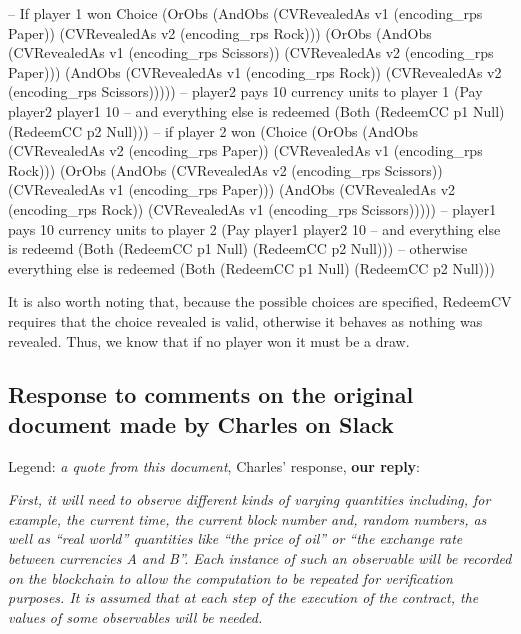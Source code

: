 \documentclass[
      acmsmall
    , screen
    , review=true
  ]{acmart}
\begin{document}
-- If player 1 won
Choice (OrObs (AndObs (CVRevealedAs v1 (encoding\_rps Paper))
                      (CVRevealedAs v2 (encoding\_rps Rock)))
              (OrObs (AndObs (CVRevealedAs v1 (encoding\_rps Scissors))
                             (CVRevealedAs v2 (encoding\_rps Paper)))
                     (AndObs (CVRevealedAs v1 (encoding\_rps Rock))
                             (CVRevealedAs v2 (encoding\_rps Scissors)))))
-- player2 pays 10 currency units to player 1
       (Pay player2 player1 10
-- and everything else is redeemed
          (Both (RedeemCC p1 Null)
                (RedeemCC p2 Null)))
-- if player 2 won
       (Choice (OrObs (AndObs (CVRevealedAs v2 (encoding\_rps Paper))
                              (CVRevealedAs v1 (encoding\_rps Rock)))
                      (OrObs (AndObs (CVRevealedAs v2 (encoding\_rps Scissors))
                                     (CVRevealedAs v1 (encoding\_rps Paper)))
                             (AndObs (CVRevealedAs v2 (encoding\_rps Rock))
                                     (CVRevealedAs v1 (encoding\_rps Scissors)))))
-- player1 pays 10 currency units to player 2
               (Pay player1 player2 10
-- and everything else is redeemd
                  (Both (RedeemCC p1 Null)
                        (RedeemCC p2 Null)))
-- otherwise everything else is redeemed
               (Both (RedeemCC p1 Null)
                     (RedeemCC p2 Null)))


It is also worth noting that, because the possible choices are specified, RedeemCV requires that the choice revealed is valid, otherwise it behaves as nothing was revealed. Thus, we know that if no player won it must be a draw.


\subsection{Response to comments on the original document made by Charles on Slack}

Legend: {\it a quote from this document}, Charles' response, {\bf our reply}:


{\it
First, it will need to observe different kinds of varying quantities including, for example, the current time, the current block number and, random numbers, as well as ``real world'' quantities like ``the price of oil'' or ``the exchange rate between currencies A and B''. Each instance of such an observable will be recorded on the blockchain to allow the computation to be repeated for verification purposes. It is assumed that at each step of the execution of the contract, the values of some observables will be needed.
}
\end{document}
